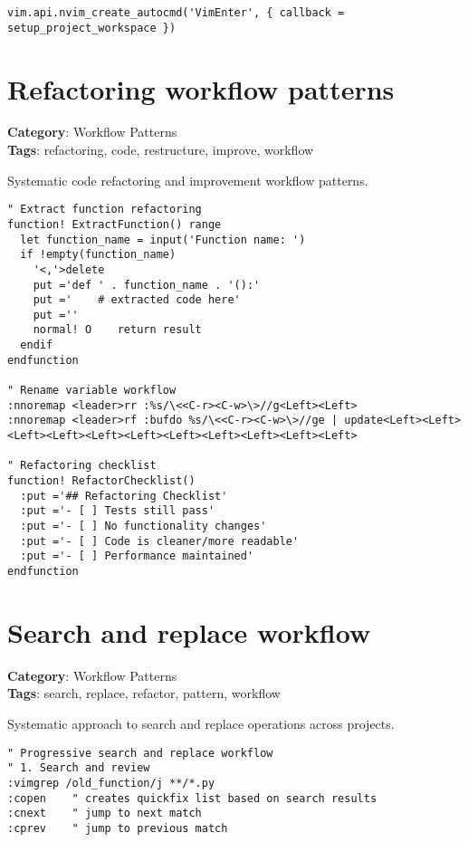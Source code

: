 {{{{{{{{{{{{{{{{{{{\begin{Exa*}{}
\begin{Verbatim}[fontsize=\footnotesize, breaklines, breakanywhere]
vim.api.nvim_create_autocmd('VimEnter', { callback = setup_project_workspace })
\end{Verbatim}
\end{Exa*}

\section{Refactoring workflow patterns}

\textbf{Category}: Workflow Patterns\\ \textbf{Tags}: refactoring, code, restructure, improve, workflow
\vspace{0.5cm}

Systematic code refactoring and improvement workflow patterns.

\begin{Exa*}{}
\begin{Verbatim}[fontsize=\footnotesize, breaklines, breakanywhere]
" Extract function refactoring
function! ExtractFunction() range
  let function_name = input('Function name: ')
  if !empty(function_name)
    '<,'>delete
    put ='def ' . function_name . '():'
    put ='    # extracted code here'
    put =''
    normal! O    return result
  endif
endfunction

" Rename variable workflow  
:nnoremap <leader>rr :%s/\<<C-r><C-w>\>//g<Left><Left>
:nnoremap <leader>rf :bufdo %s/\<<C-r><C-w>\>//ge | update<Left><Left><Left><Left><Left><Left><Left><Left><Left><Left><Left>

" Refactoring checklist
function! RefactorChecklist()
  :put ='## Refactoring Checklist'
  :put ='- [ ] Tests still pass'
  :put ='- [ ] No functionality changes'  
  :put ='- [ ] Code is cleaner/more readable'
  :put ='- [ ] Performance maintained'
endfunction
\end{Verbatim}
\end{Exa*}

\section{Search and replace workflow}

\textbf{Category}: Workflow Patterns\\ \textbf{Tags}: search, replace, refactor, pattern, workflow
\vspace{0.5cm}

Systematic approach to search and replace operations across projects.

\begin{Exa*}{}
\begin{Verbatim}[fontsize=\footnotesize, breaklines, breakanywhere]
" Progressive search and replace workflow
" 1. Search and review
:vimgrep /old_function/j **/*.py
:copen    " creates quickfix list based on search results
:cnext    " jump to next match
:cprev    " jump to previous match


\end{Verbatim}
\end{Exa*}}}}}}}}}}}}}}}}}}}}
